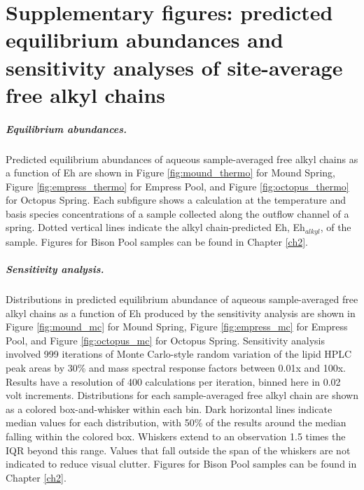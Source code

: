 \chapter{Supplementary figures: predicted equilibrium abundances and sensitivity analyses of site-average free alkyl chains}\label{app2}

\clearpage

\doublespace

\paragraph*{Equilibrium abundances.} Predicted equilibrium abundances of aqueous sample-averaged free alkyl chains as a function of Eh are shown in Figure \ref{fig:mound_thermo} for Mound Spring, Figure \ref{fig:empress_thermo} for Empress Pool, and Figure \ref{fig:octopus_thermo} for Octopus Spring. Each subfigure shows a calculation at the temperature and basis species concentrations of a sample collected along the outflow channel of a spring. Dotted vertical lines indicate the alkyl chain-predicted Eh, Eh$_{alkyl}$, of the sample. Figures for Bison Pool samples can be found in Chapter \ref{ch2}.

\paragraph*{Sensitivity analysis.}
Distributions in predicted equilibrium abundance of aqueous sample-averaged free alkyl chains as a function of Eh produced by the sensitivity analysis are shown in Figure \ref{fig:mound_mc} for Mound Spring, Figure \ref{fig:empress_mc} for Empress Pool, and Figure \ref{fig:octopus_mc} for Octopus Spring. Sensitivity analysis involved 999 iterations of Monte Carlo-style random variation of the lipid HPLC peak areas by 30\% and mass spectral response factors between 0.01x and 100x. Results have a resolution of 400 calculations per iteration, binned here in 0.02 volt increments. Distributions for each sample-averaged free alkyl chain are shown as a colored box-and-whisker within each bin. Dark horizontal lines indicate median values for each distribution, with 50\% of the results around the median falling within the colored box. Whiskers extend to an observation 1.5 times the IQR beyond this range. Values that fall outside the span of the whiskers are not indicated to reduce visual clutter. Figures for Bison Pool samples can be found in Chapter \ref{ch2}.

